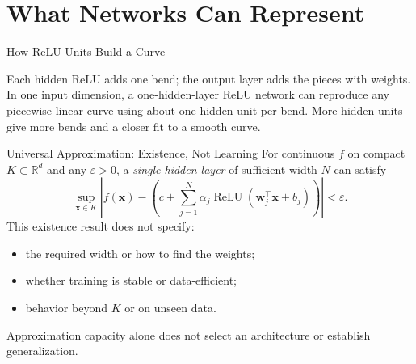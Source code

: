 \documentclass{ntuabeamer}
\begin{document}

\section{What Networks Can Represent}

\begin{frame}{How ReLU Units Build a Curve}
  \centering
  \par\vspace{0.1cm}
  Each hidden ReLU adds one bend; the output layer adds the pieces with weights.
  In one input dimension, a one-hidden-layer ReLU network can reproduce any piecewise-linear curve using about one hidden unit per bend.
  More hidden units give more bends and a closer fit to a smooth curve.
\end{frame}

\begin{frame}{Universal Approximation: Existence, Not Learning}
  For continuous $f$ on compact $K\subset\mathbb R^d$ and any $\varepsilon>0$,
  a \emph{single hidden layer} of sufficient width $N$ can satisfy
  \[
    \sup_{\mathbf x\in K}\left|f(\mathbf x)-
      \left(c+\sum_{j=1}^{N}\alpha_j
        \operatorname{ReLU}(\mathbf w_j^\top\mathbf x+b_j)\right)\right|<\varepsilon.
  \]
  This existence result does not specify:
  \begin{itemize}
    \item the required width or how to find the weights;
    \item whether training is stable or data-efficient;
    \item behavior beyond $K$ or on unseen data.
  \end{itemize}
  Approximation capacity alone does not select an architecture or establish generalization.
\end{frame}
\end{document}
